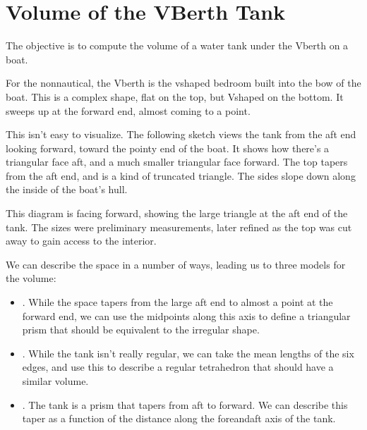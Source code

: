 \documentclass[letterpaper,10pt,english]{sphinxmanual}
\begin{document}
\section{Volume of the V\sphinxhyphen{}Berth Tank}
\label{\detokenize{index:volume-of-the-v-berth-tank}}\label{\detokenize{index::doc}}
\sphinxAtStartPar
The objective is to compute the volume of a water tank under the V\sphinxhyphen{}berth on a boat.

\sphinxAtStartPar
For the non\sphinxhyphen{}nautical, the V\sphinxhyphen{}berth is the v\sphinxhyphen{}shaped bedroom built into the bow of
the boat. This is a complex shape, flat on the top, but V\sphinxhyphen{}shaped on the bottom.
It sweeps up at the forward end, almost coming to a point.

\sphinxAtStartPar
This isn’t easy to visualize. The following sketch views the tank from the aft end
looking forward, toward the pointy end of the boat.
It shows how there’s a triangular face aft, and a much smaller triangular face forward.
The top tapers from the aft end, and is a kind of truncated triangle.
The sides slope down along the inside of the boat’s hull.

\noindent{}

\sphinxAtStartPar
This diagram is facing forward, showing the large triangle at the aft end of the tank.
The sizes were preliminary measurements, later refined as the top was cut away to gain
access to the interior.

\sphinxAtStartPar
We can describe the space in a number of ways, leading us to three models for the volume:
\begin{itemize}
\item {} 
\sphinxAtStartPar
{}. While the space tapers from the large aft end to almost a point at the forward end,
we can use the midpoints along this axis to define
a triangular prism that should be equivalent to the irregular shape.

\item {} 
\sphinxAtStartPar
{}. While the tank isn’t really regular, we can take the mean lengths of the six edges,
and use this to describe a regular tetrahedron that should have a similar volume.

\item {} 
\sphinxAtStartPar
{}. The tank is a prism that tapers from aft to forward. We can describe this taper
as a function of the distance along the fore\sphinxhyphen{}and\sphinxhyphen{}aft axis of the tank.

\end{itemize}
\end{document}
